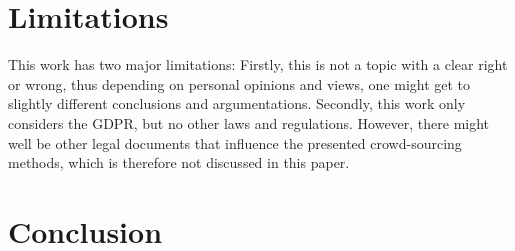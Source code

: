 \documentclass[a4paper,12pt]{report}
\begin{document}
	\chapter{Limitations}
	\startsection
		This work has two major limitations:
		Firstly, this is not a topic with a clear right or wrong, thus depending on personal opinions and views, one might get to slightly different conclusions and argumentations.
		Secondly, this work only considers the GDPR, but no other laws and regulations.
		However, there might well be other legal documents that influence the presented crowd-sourcing methods, which is therefore not discussed in this paper.
	\closesection
	
	\chapter{Conclusion}
	
	\newpage
	\printbibliography
\end{document}
